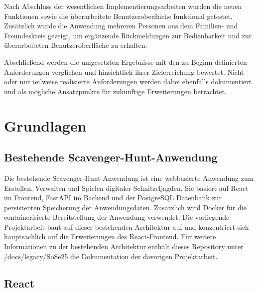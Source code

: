 ﻿\documentclass[oneside]{ausarbeitung}
\begin{document}
Nach Abschluss der wesentlichen Implementierungsarbeiten wurden die neuen Funktionen sowie die überarbeitete Benutzeroberfläche funktional getestet. 
Zusätzlich wurde die Anwendung mehreren Personen aus dem Familien- und Freundeskreis gezeigt, um ergänzende Rückmeldungen zur Bedienbarkeit und
zur überarbeiteten Benutzeroberfläche zu erhalten.

Abschließend werden die umgesetzten Ergebnisse mit den zu Beginn definierten Anforderungen verglichen und hinsichtlich ihrer Zielerreichung bewertet. 
Nicht oder nur teilweise realisierte Anforderungen werden dabei ebenfalls dokumentiert und als mögliche Ansatzpunkte für zukünftige Erweiterungen 
betrachtet.



\chapter{Grundlagen}
\label{cha:grundlagen}


\section{Bestehende Scavenger-Hunt-Anwendung}
\label{sec:scavengerhuntanwendung}

Die bestehende Scavenger-Hunt-Anwendung ist eine webbasierte Anwendung zum Erstellen, Verwalten und Spielen digitaler Schnitzeljagden. Sie basiert auf 
React im Frontend, FastAPI im Backend und der PostgreSQL Datenbank zur persistenten Speicherung der Anwendungsdaten. Zusätzlich wird Docker für die 
containerisierte Bereitstellung der Anwendung verwendet. Die vorliegende Projektarbeit baut auf dieser bestehenden Architektur auf und konzentriert 
sich hauptsächlich auf die Erweiterungen des React-Frontend. Für weitere Informationen zu der bestehenden Architektur enthält dieses Repository unter 
/docs/legacy/SoSe25 die Dokumentation der davorigen Projektarbeit.


\section{React}
\label{sec:react}
\end{document}
